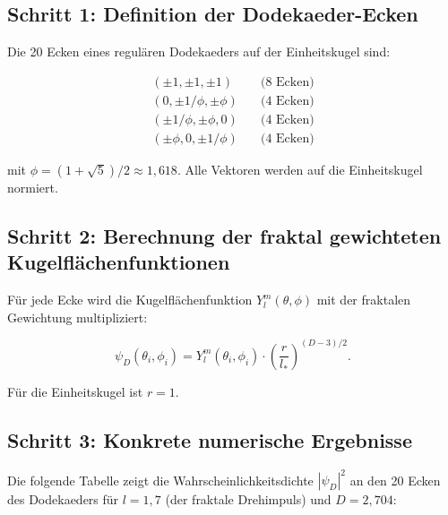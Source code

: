 \subsection{Schritt 1: Definition der Dodekaeder-Ecken}

Die 20 Ecken eines regulären Dodekaeders auf der Einheitskugel sind:

\begin{equation}
\begin{aligned}
(\pm 1, \pm 1, \pm 1) &\quad \text{(8 Ecken)} \\
(0, \pm 1/\phi, \pm \phi) &\quad \text{(4 Ecken)} \\
(\pm 1/\phi, \pm \phi, 0) &\quad \text{(4 Ecken)} \\
(\pm \phi, 0, \pm 1/\phi) &\quad \text{(4 Ecken)}
\end{aligned} \tag{6.2}
\end{equation}

mit \( \phi = (1+\sqrt{5})/2 \approx 1,618 \). Alle Vektoren werden auf die Einheitskugel normiert.

\subsection{Schritt 2: Berechnung der fraktal gewichteten Kugelflächenfunktionen}

Für jede Ecke wird die Kugelflächenfunktion \( Y_l^m(\theta, \phi) \) mit der fraktalen Gewichtung multipliziert:

\begin{equation}
\psi_D(\theta_i, \phi_i) = Y_l^m(\theta_i, \phi_i) \cdot \left( \frac{r}{l_*} \right)^{(D-3)/2}. \tag{6.3}
\end{equation}

Für die Einheitskugel ist \( r = 1 \).

\subsection{Schritt 3: Konkrete numerische Ergebnisse}

Die folgende Tabelle zeigt die Wahrscheinlichkeitsdichte \( |\psi_D|^2 \) an den 20 Ecken des Dodekaeders für \( l = 1,7 \) (der fraktale Drehimpuls) und
\( D = 2,704 \):

